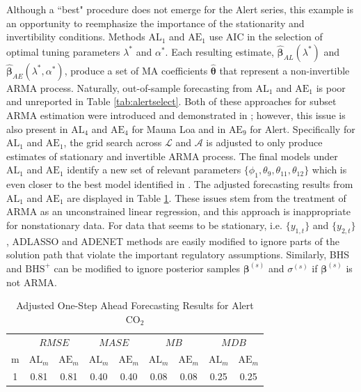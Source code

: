 Although a ``best" procedure does not emerge for the Alert series, this example is an opportunity to reemphasize the importance of the stationarity and invertibility conditions. Methods $\textrm{AL}_1$ and $\textrm{AE}_1$  use AIC in the selection of optimal tuning parameters $\lambda^*$ and $\alpha^*$. Each resulting estimate, $\hat{\bm{\beta}}_{AL}(\lambda^*)$ and $\hat{\bm{\beta}}_{AE}(\lambda^*,\alpha^*)$, produce a set of MA coefficients $\hat{\bm{\theta}}$ that represent a non-invertible ARMA process. Naturally, out-of-sample forecasting from $\textrm{AL}_1$ and $\textrm{AE}_1$ is poor and unreported in Table \ref{tab:alertselect}. Both of these approaches for subset ARMA estimation were introduced and demonstrated in \cite{Chen2011}; however, this issue is also present in $\textrm{AL}_4$ and $\textrm{AE}_4$ for Mauna Loa and in $\textrm{AE}_9$ for Alert. Specifically for $\textrm{AL}_1$ and $\textrm{AE}_1$, the grid search across $\mathcal{L}$ and $\mathcal{A}$ is adjusted to only produce estimates of stationary and invertible ARMA process. The final models under $\textrm{AL}_1$ and $\textrm{AE}_1$ identify a new set of relevant parameters $\{\phi_1,\theta_9,\theta_{11},\theta_{12}\}$ which is even closer to the best model identified in \cite{Chen2011}. The adjusted forecasting results from $\textrm{AL}_1$ and $\textrm{AE}_1$ are displayed in Table \ref{tab:alertselect2}. These issues stem from the treatment of ARMA as an unconstrained linear regression, and this approach is inappropriate for nonstationary data. For data that seems to be stationary, i.e. $\{y_{1,t}\}$ and $\{y_{2,t}\}$, ADLASSO and ADENET methods are easily modified to ignore parts of the solution path that violate the important regulatory assumptions. Similarly, BHS and $\textrm{BHS}^+$ can be modified to ignore posterior samples $\bm{\beta}^{(s)}$ and $\sigma^{(s)}$ if $\bm{\beta}^{(s)}$ is not ARMA.

\begin{table}[htbp]
\footnotesize
\centering
\caption{Adjusted One-Step Ahead Forecasting Results for Alert $\textrm{CO}_2$}
\begin{tabular}{c|cc|cc|cc|cc}
  \hline
   & \multicolumn{2}{c|}{$RMSE$} & \multicolumn{2}{c|}{$MASE$} &
  \multicolumn{2}{c|}{$MB$} & \multicolumn{2}{c}{$MDB$}\\
   m & $\textrm{AL}_m$ & $\textrm{AE}_m$ &
  $\textrm{AL}_m$ & $\textrm{AE}_m$ &
  $\textrm{AL}_m$ & $\textrm{AE}_m$ &
  $\textrm{AL}_m$ & $\textrm{AE}_m$ \\
  \hline
  1 & 0.81 & 0.81 & 0.40 & 0.40 & 0.08 & 0.08 & 0.25 & 0.25 \\ 
  \hline
\end{tabular}
\label{tab:alertselect2}
\end{table}



